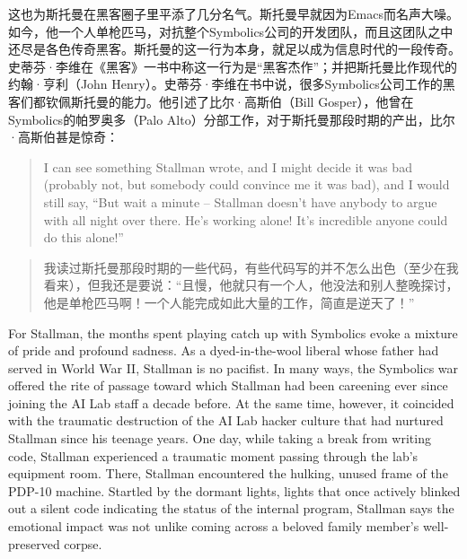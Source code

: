\ifdefined\chs
这也为斯托曼在黑客圈子里平添了几分名气。斯托曼早就因为Emacs而名声大噪。如今，他一个人单枪匹马，对抗整个Symbolics公司的开发团队，而且这团队之中还尽是各色传奇黑客。斯托曼的这一行为本身，就足以成为信息时代的一段传奇。史蒂芬·李维在《黑客》一书中称这一行为是``黑客杰作''；并把斯托曼比作现代的约翰·亨利（John Henry）。史蒂芬·李维在书中说，很多Symbolics公司工作的黑客们都钦佩斯托曼的能力。他引述了比尔·高斯伯（Bill Gosper），他曾在Symbolics的帕罗奥多（Palo Alto）分部工作，对于斯托曼那段时期的产出，比尔·高斯伯甚是惊奇：
\fi

\ifdefined\eng
\begin{quote}
I can see something Stallman wrote, and I might decide it was bad (probably not, but somebody could convince me it was bad), and I would still say, ``But wait a minute -- Stallman doesn't have anybody to argue with all night over there. He's working alone! It's incredible anyone could do this alone!''
\end{quote}
\fi

\ifdefined\chs
\begin{quote}
我读过斯托曼那段时期的一些代码，有些代码写的并不怎么出色（至少在我看来），但我还是要说：``且慢，他就只有一个人，他没法和别人整晚探讨，他是单枪匹马啊！一个人能完成如此大量的工作，简直是逆天了！''
\end{quote}
\fi

\ifdefined\eng
For Stallman, the months spent playing catch up with Symbolics evoke a mixture of pride and profound sadness. As a dyed-in-the-wool liberal whose father had served in World War II, Stallman is no pacifist. In many ways, the Symbolics war offered the rite of passage toward which Stallman had been careening ever since joining the AI Lab staff a decade before. At the same time, however, it coincided with the traumatic destruction of the AI Lab hacker culture that had nurtured Stallman since his teenage years. One day, while taking a break from writing code, Stallman experienced a traumatic moment passing through the lab's equipment room. There, Stallman encountered the hulking, unused frame of the PDP-10 machine. Startled by the dormant lights, lights that once actively blinked out a silent code indicating the status of the internal program, Stallman says the emotional impact was not unlike coming across a beloved family member's well-preserved corpse.
\fi


